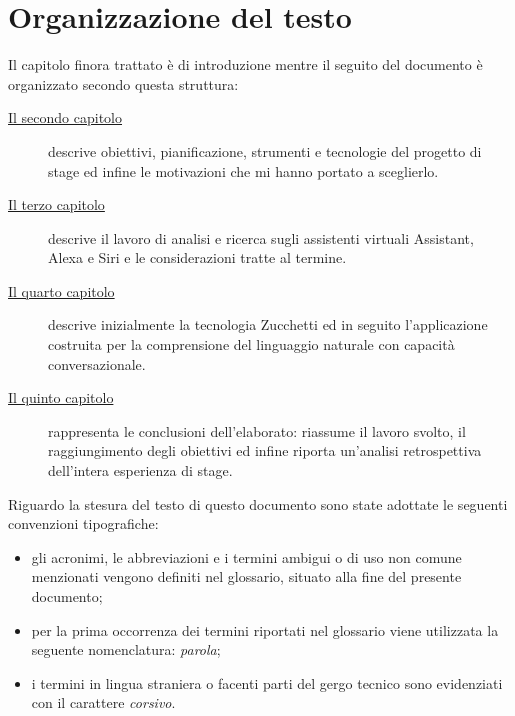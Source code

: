 \section{Organizzazione del testo}
Il capitolo finora trattato è di introduzione mentre il seguito del documento è organizzato secondo questa struttura:
\begin{description}
    \item[{\hyperref[cap:lo-stage]{Il secondo capitolo}}] descrive obiettivi, pianificazione, strumenti e tecnologie del progetto di stage ed infine le motivazioni che mi hanno portato a sceglierlo.
    
    \item[{\hyperref[cap:assistenti-virtuali]{Il terzo capitolo}}] descrive il lavoro di analisi e ricerca sugli assistenti virtuali Assistant, Alexa e Siri e le considerazioni tratte al termine.
    
    \item[{\hyperref[cap:applicazione]{Il quarto capitolo}}] descrive inizialmente la tecnologia Zucchetti ed in seguito l'applicazione costruita per la comprensione del linguaggio naturale con capacità conversazionale.
    
    \item[{\hyperref[cap:conclusione]{Il quinto capitolo}}] rappresenta le conclusioni dell'elaborato: riassume il lavoro svolto, il raggiungimento degli obiettivi ed infine riporta un'analisi retrospettiva dell'intera esperienza di stage.
\end{description}

Riguardo la stesura del testo di questo documento sono state adottate le seguenti convenzioni tipografiche:
\begin{itemize}
	\item gli acronimi, le abbreviazioni e i termini ambigui o di uso non comune menzionati vengono definiti nel glossario, situato alla fine del presente documento;
	\item per la prima occorrenza dei termini riportati nel glossario viene utilizzata la seguente nomenclatura: \emph{parola}\glsfirstoccur;
	\item i termini in lingua straniera o facenti parti del gergo tecnico sono evidenziati con il carattere \emph{corsivo}.
\end{itemize}